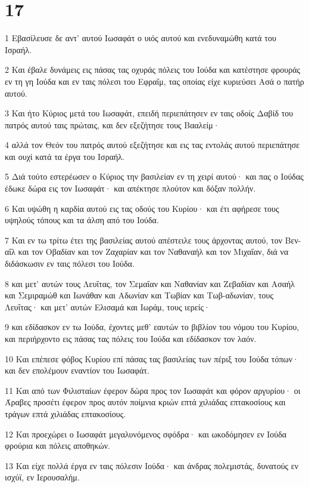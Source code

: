 \chapter{17}

\par 1 Εβασίλευσε δε αντ' αυτού Ιωσαφάτ ο υιός αυτού και ενεδυναμώθη κατά του Ισραήλ.
\par 2 Και έβαλε δυνάμεις εις πάσας τας οχυράς πόλεις του Ιούδα και κατέστησε φρουράς εν τη γη Ιούδα και εν ταις πόλεσι του Εφραΐμ, τας οποίας είχε κυριεύσει Ασά ο πατήρ αυτού.
\par 3 Και ήτο Κύριος μετά του Ιωσαφάτ, επειδή περιεπάτησεν εν ταις οδοίς Δαβίδ του πατρός αυτού ταις πρώταις, και δεν εξεζήτησε τους Βααλείμ·
\par 4 αλλά τον Θεόν του πατρός αυτού εξεζήτησε και εις τας εντολάς αυτού περιεπάτησε και ουχί κατά τα έργα του Ισραήλ.
\par 5 Διά τούτο εστερέωσεν ο Κύριος την βασιλείαν εν τη χειρί αυτού· και πας ο Ιούδας έδωκε δώρα εις τον Ιωσαφάτ· και απέκτησε πλούτον και δόξαν πολλήν.
\par 6 Και υψώθη η καρδία αυτού εις τας οδούς του Κυρίου· και έτι αφήρεσε τους υψηλούς τόπους και τα άλση από του Ιούδα.
\par 7 Και εν τω τρίτω έτει της βασιλείας αυτού απέστειλε τους άρχοντας αυτού, τον Βεν-αΐλ και τον Οβαδίαν και τον Ζαχαρίαν και τον Ναθαναήλ και τον Μιχαΐαν, διά να διδάσκωσιν εν ταις πόλεσι του Ιούδα.
\par 8 και μετ' αυτών τους Λευΐτας, τον Σεμαΐαν και Ναθανίαν και Ζεβαδίαν και Ασαήλ και Σεμιραμώθ και Ιωνάθαν και Αδωνίαν και Τωβίαν και Τωβ-αδωνίαν, τους Λευΐτας· και μετ' αυτών Ελισαμά και Ιωράμ, τους ιερείς·
\par 9 και εδίδασκον εν τω Ιούδα, έχοντες μεθ' εαυτών το βιβλίον του νόμου του Κυρίου, και περιήρχοντο εις πάσας τας πόλεις του Ιούδα και εδίδασκον τον λαόν.
\par 10 Και επέπεσε φόβος Κυρίου επί πάσας τας βασιλείας των πέριξ του Ιούδα τόπων· και δεν επολέμουν εναντίον του Ιωσαφάτ.
\par 11 Και από των Φιλισταίων έφερον δώρα προς τον Ιωσαφάτ και φόρον αργυρίου· οι Άραβες προσέτι έφερον προς αυτόν ποίμνια κριών επτά χιλιάδας επτακοσίους και τράγων επτά χιλιάδας επτακοσίους.
\par 12 Και προεχώρει ο Ιωσαφάτ μεγαλυνόμενος σφόδρα· και ωκοδόμησεν εν Ιούδα φρούρια και πόλεις αποθηκών.
\par 13 Και είχε πολλά έργα εν ταις πόλεσιν Ιούδα· και άνδρας πολεμιστάς, δυνατούς εν ισχύϊ, εν Ιερουσαλήμ.
